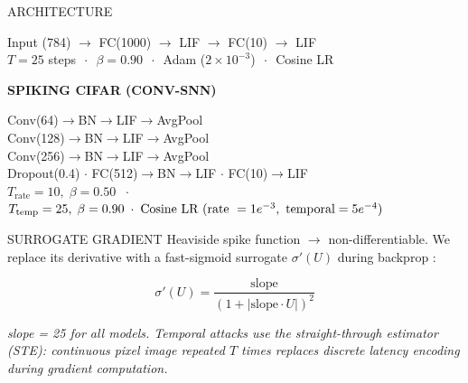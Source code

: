 \documentclass[final]{beamer}
\newlength{\colone}
\begin{document}
\begin{frame}[t]
\begin{columns}[t]
\begin{column}{\colone}
\begin{block}{ARCHITECTURE}
\begin{futurebox}
      \small
      {\color{iitgnblue!60!black}
        Input (784) $\rightarrow$ FC(1000) $\rightarrow$ LIF $\rightarrow$ FC(10) $\rightarrow$ LIF \\[0.3em]
        $T = 25$ steps $\,\cdot\,$ $\beta = 0.90$ $\,\cdot\,$ Adam ($2\times10^{-3}$) $\,\cdot\,$ Cosine LR 
      }

      

      {\centering {} \normalsize \bfseries SPIKING CIFAR (CONV-SNN) \par}
      \vspace{0.4em}
      \small
      {\color{iitgnblue!60!black}
        Conv(64)$\rightarrow$BN$\rightarrow$LIF$\rightarrow$AvgPool \\[0.3em]
        Conv(128)$\rightarrow$BN$\rightarrow$LIF$\rightarrow$AvgPool \\[0.3em]
        Conv(256)$\rightarrow$BN$\rightarrow$LIF$\rightarrow$AvgPool \\[0.3em]
        Dropout(0.4) $\cdot$ FC(512)$\rightarrow$BN$\rightarrow$LIF $\cdot$ FC(10)$\rightarrow$LIF \\[0.3em]
        $T_{\text{rate}} = 10,\; \beta=0.50$ $\;\cdot\;$
        $T_{\text{temp}} = 25,\; \beta = 0.90 \\\;\cdot\; \text{Cosine LR (rate } = 1e^{-3},\ \text{temporal} = 5e^{-4})$
        
      }
    \end{futurebox}
  \end{block}

  \begin{block}{SURROGATE GRADIENT}
    Heaviside spike function $\rightarrow$ non-differentiable.
    We replace its derivative with a fast-sigmoid surrogate $\sigma'(U)$
    during backprop :

    \[
      \sigma'(U) = \frac{\text{slope}}{(1 + |\text{slope} \cdot U|)^2}
    \]

    \small\textit{slope = 25 for all models. Temporal attacks use the
    straight-through estimator (STE): continuous pixel image repeated $T$ times
    replaces discrete latency encoding during gradient computation.}
  \end{block}

\end{column}


\end{columns}
\end{frame}
\end{document}
